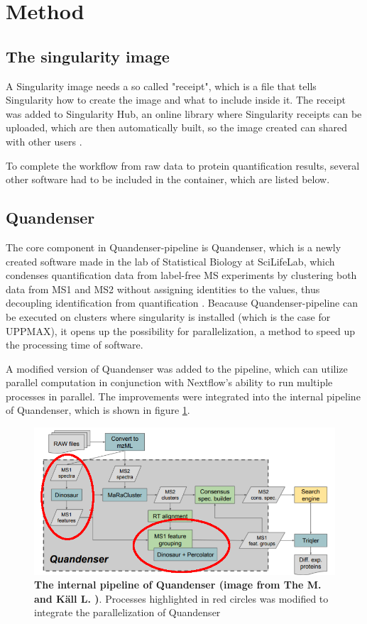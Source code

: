 \section{Method}

\subsection{The singularity image}
A Singularity image needs a so called "receipt", which is a file that tells Singularity how to create the image and what to include inside it. The receipt was added to Singularity Hub, an online library where Singularity receipts can be uploaded, which are then automatically built, so the image created can shared with other users \cite{singularity-hub}.

To complete the workflow from raw data to protein quantification results, several other software had to be included in the container, which are listed below.

\subsection{Quandenser} \label{ssec:quandenser-method}
 The core component in Quandenser-pipeline is Quandenser, which is a newly created software made in the lab of Statistical Biology at SciLifeLab, which condenses quantification data from label-free MS experiments by clustering both data from MS1 and MS2 without assigning identities to the values, thus decoupling identification from quantification \cite{quandenser}. Beacause Quandenser-pipeline can be executed on clusters where singularity is installed (which is the case for UPPMAX), it opens up the possibility for parallelization, a method to speed up the processing time of software.

A modified version of Quandenser was added to the pipeline, which can utilize parallel computation in conjunction with Nextflow's ability to run multiple processes in parallel. The improvements were integrated into the internal pipeline of Quandenser, which is shown in figure \ref{fig:quandenser-internal-pipeline}.

\begin{figure}[H]
  \centering
  \includegraphics[width=\linewidth]{pictures/quandenser-internal.png}
  \caption{\textbf{The internal pipeline of Quandenser (image from The M. and Käll L. \cite{quandenser})}. Processes highlighted in red circles was modified to integrate the parallelization of Quandenser}
  \label{fig:quandenser-internal-pipeline}
\end{figure}

